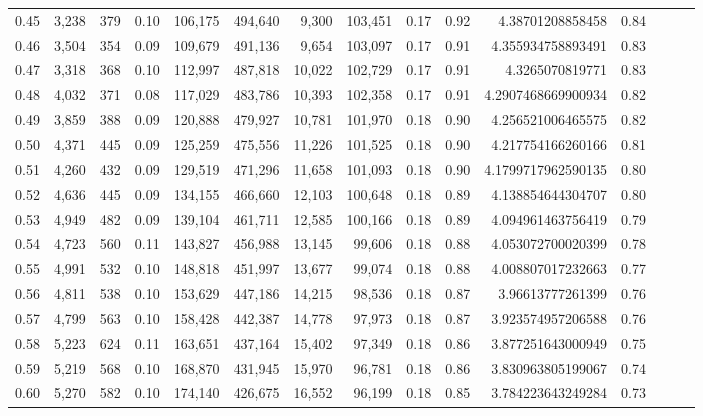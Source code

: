 \begin{tabular}{rrrrrrrrrrrrrrr}
0.45 &   3,238 &    379 &  0.10 &  106,175 &  494,640 &    9,300 &  103,451 &  0.17 &  0.92 &     4.38701208858458 &      0.84 \\
0.46 &   3,504 &    354 &  0.09 &  109,679 &  491,136 &    9,654 &  103,097 &  0.17 &  0.91 &    4.355934758893491 &      0.83 \\
0.47 &   3,318 &    368 &  0.10 &  112,997 &  487,818 &   10,022 &  102,729 &  0.17 &  0.91 &      4.3265070819771 &      0.83 \\
0.48 &   4,032 &    371 &  0.08 &  117,029 &  483,786 &   10,393 &  102,358 &  0.17 &  0.91 &   4.2907468669900934 &      0.82 \\
0.49 &   3,859 &    388 &  0.09 &  120,888 &  479,927 &   10,781 &  101,970 &  0.18 &  0.90 &    4.256521006465575 &      0.82 \\
0.50 &   4,371 &    445 &  0.09 &  125,259 &  475,556 &   11,226 &  101,525 &  0.18 &  0.90 &    4.217754166260166 &      0.81 \\
0.51 &   4,260 &    432 &  0.09 &  129,519 &  471,296 &   11,658 &  101,093 &  0.18 &  0.90 &   4.1799717962590135 &      0.80 \\
0.52 &   4,636 &    445 &  0.09 &  134,155 &  466,660 &   12,103 &  100,648 &  0.18 &  0.89 &    4.138854644304707 &      0.80 \\
0.53 &   4,949 &    482 &  0.09 &  139,104 &  461,711 &   12,585 &  100,166 &  0.18 &  0.89 &    4.094961463756419 &      0.79 \\
0.54 &   4,723 &    560 &  0.11 &  143,827 &  456,988 &   13,145 &   99,606 &  0.18 &  0.88 &    4.053072700020399 &      0.78 \\
0.55 &   4,991 &    532 &  0.10 &  148,818 &  451,997 &   13,677 &   99,074 &  0.18 &  0.88 &    4.008807017232663 &      0.77 \\
0.56 &   4,811 &    538 &  0.10 &  153,629 &  447,186 &   14,215 &   98,536 &  0.18 &  0.87 &     3.96613777261399 &      0.76 \\
0.57 &   4,799 &    563 &  0.10 &  158,428 &  442,387 &   14,778 &   97,973 &  0.18 &  0.87 &    3.923574957206588 &      0.76 \\
0.58 &   5,223 &    624 &  0.11 &  163,651 &  437,164 &   15,402 &   97,349 &  0.18 &  0.86 &    3.877251643000949 &      0.75 \\
0.59 &   5,219 &    568 &  0.10 &  168,870 &  431,945 &   15,970 &   96,781 &  0.18 &  0.86 &    3.830963805199067 &      0.74 \\
0.60 &   5,270 &    582 &  0.10 &  174,140 &  426,675 &   16,552 &   96,199 &  0.18 &  0.85 &    3.784223643249284 &      0.73 \\

\end{tabular}
